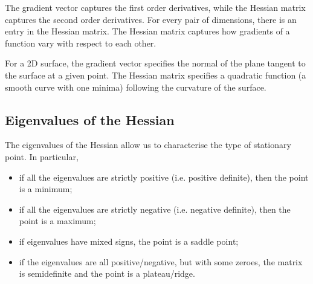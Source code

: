 \documentclass[a4paper, openany]{memoir}
\begin{document}
The gradient vector captures the first order derivatives, while the Hessian matrix captures the second order derivatives. For every pair of dimensions, there is an entry in the Hessian matrix. The Hessian matrix captures how gradients of a function vary with respect to each other.

For a 2D surface, the gradient vector specifies the normal of the plane tangent to the surface at a given point. The Hessian matrix specifies a quadratic function (a smooth curve with one minima) following the curvature of the surface.

\subsection{Eigenvalues of the Hessian}
The eigenvalues of the Hessian allow us to characterise the type of stationary point. In particular,
\begin{itemize}
    \item if all the eigenvalues are strictly positive (i.e. positive definite), then the point is a minimum;
    \item if all the eigenvalues are strictly negative (i.e. negative definite), then the point is a maximum;
    \item if eigenvalues have mixed signs, the point is a saddle point;
    \item if the eigenvalues are all positive/negative, but with some zeroes, the matrix is semidefinite and the point is a plateau/ridge.
\end{itemize}
\end{document}
